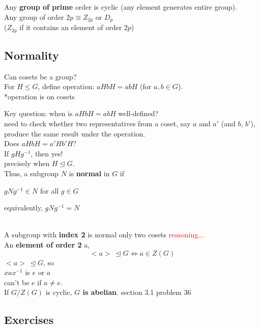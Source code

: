\documentclass[12pt]{article}
\begin{document}
Any \textbf{group of prime} order is cyclic (any element generates entire group).\\

Any group of order $2p \cong Z_{2p}$ or $D_p$ \\
($Z_{2p}$ if it contains an element of order $2p$)


\subsection*{Normality}
Can cosets be a group?\\

For $H \leq G$, define operation: $aH bH= abH$ (for $a, b \in G$).\\
*operation is on cosets

Key question: when is $aH bH = abH$ well-defined?\\

\textcolor[gray]{0.5}{need to check whether two representatives from a coset, say $a$ and $a'$ (and $b$, $b'$), produce the same result under the operation.\\
Does $aH bH = a'H b'H$?\\
If $gHg^{-1}$, then yes! }\\

precisely when $H \trianglelefteq G$.\\

Thus, a subgroup $N$ is \textbf{normal} in $G$ if \\

\centerline{$gNg^{-1} \in N$ for all $g \in G$}
\centerline{equivalently, $gNg^{-1} = N$}
\ \\

A subgroup with \textbf{index 2} is normal
\textcolor[gray]{0.5}{only two cosets}
\textcolor{red}{reasoning...}\\

An \textbf{element of order 2} a, 
$$<a>\ \trianglelefteq G \iff a \in Z(G)$$
\textcolor[gray]{0.5}{$<a>\ \trianglelefteq G$, so \\
$xax^{-1}$ is $e$ or $a$ \\
can't be $e$ if $a \neq e$.}\\

If $G / Z(G)$ is cyclic, \textbf{$G$ is abelian}.
\textcolor[gray]{0.5}{section 3.1 problem 36}



\subsection*{Exercises}
    
\end{document}
